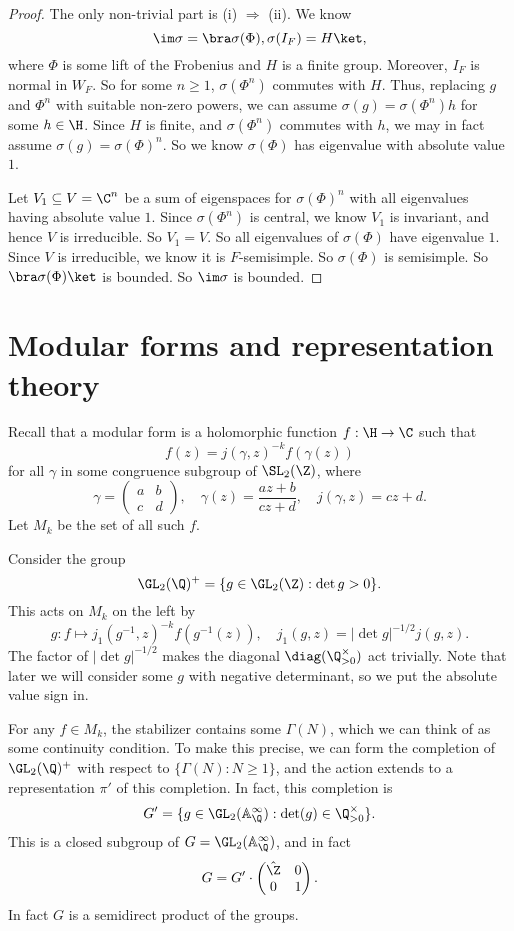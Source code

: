 \documentclass[a4paper]{article}
\newcommand\A{\mathbb{A}}
\begin{document}
\begin{proof}
  The only non-trivial part is (i) $\Rightarrow$ (ii). We know
  \[
    \im \sigma = \bra \sigma(\Phi), \sigma(I_F) = H\ket,
  \]
  where $\Phi$ is some lift of the Frobenius and $H$ is a finite group. Moreover, $I_F$ is normal in $W_F$. So for some $n \geq 1$, $\sigma(\Phi^n)$ commutes with $H$. Thus, replacing $g$ and $\Phi^n$ with suitable non-zero powers, we can assume $\sigma(g) = \sigma(\Phi^n) h$ for some $h \in \H$. Since $H$ is finite, and $\sigma(\Phi^n)$ commutes with $h$, we may in fact assume $\sigma(g) = \sigma(\Phi)^n$. So we know $\sigma(\Phi)$ has eigenvalue with absolute value $1$.

  Let $V_1 \subseteq V = \C^n$ be a sum of eigenspaces for $\sigma(\Phi)^n$ with all eigenvalues having absolute value $1$. Since $\sigma(\Phi^n)$ is central, we know $V_1$ is invariant, and hence $V$ is irreducible. So $V_1 = V$. So all eigenvalues of $\sigma(\Phi)$ have eigenvalue $1$. Since $V$ is irreducible, we know it is $F$-semisimple. So $\sigma(\Phi)$ is semisimple. So $\bra \sigma(\Phi)\ket$ is bounded. So $\im \sigma$ is bounded.
\end{proof}

\section{Modular forms and representation theory}
Recall that a modular form is a holomorphic function $f: \H \to \C$ such that
\[
  f(z) = j(\gamma, z)^{-k} f(\gamma (z))
\]
for all $\gamma$ in some congruence subgroup of $\SL_2(\Z)$, where
\[
  \gamma =
  \begin{pmatrix}
    a & b\\
    c & d
  \end{pmatrix},\quad \gamma(z) = \frac{az + b}{cz + d},\quad j(\gamma, z) = cz + d.
\]
Let $M_k$ be the set of all such $f$.

Consider the group
\[
  \GL_2(\Q)^+ = \{g \in \GL_2(\Z) : \det g > 0\}.
\]
This acts on $M_k$ on the left by
\[
  g: f \mapsto j_1(g^{-1}, z)^{-k} f(g^{-1}(z)),\quad j_1(g, z) = |\det g|^{-1/2} j(g, z).
\]
The factor of $|\det g|^{-1/2}$ makes the diagonal $\diag(\Q^\times_{> 0})$ act trivially. Note that later we will consider some $g$ with negative determinant, so we put the absolute value sign in.

For any $f \in M_k$, the stabilizer contains some $\Gamma(N)$, which we can think of as some continuity condition. To make this precise, we can form the completion of $\GL_2(\Q)^+$ with respect to $\{\Gamma(N) : N \geq 1\}$, and the action extends to a representation $\pi'$ of this completion. In fact, this completion is
\[
  G' = \{g \in \GL_2(\A^\infty_{\Q}) : \det (g) \in \Q^{\times}_{> 0}\}.
\]
This is a closed subgroup of $G = \GL_2(\A^\infty_\Q)$, and in fact
\[
  G = G' \cdot
  \begin{pmatrix}
    \hat{\Z} & 0\\
    0 & 1
  \end{pmatrix}.
\]
In fact $G$ is a semidirect product of the groups.
\end{document}
